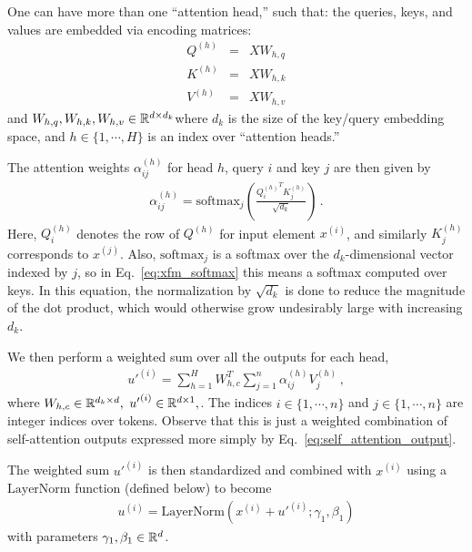 One can have more than one ``attention head,'' such that: the queries, keys, and values are embedded via encoding matrices:
\begin{eqnarray}
  Q^{(h)} &=& X W_{h,q}
  \\
  K^{(h)} &=& X W_{h,k}
  \\
  V^{(h)} &=& X W_{h,v}
\end{eqnarray}
and $W_{h,q}, W_{h,k}, W_{h,v} \in \mathbb{R}^{d\times d_k}$where $d_k$ is the size of the key/query embedding space, and $h \in \{1,\cdots,H\}$ is an index over ``attention heads.'' 

The attention weights $\alpha^{(h)}_{ij}$ for head $h$, query $i$ and key $j$ are then given by
\begin{eqnarray}
  \alpha^{(h)}_{ij} = \text{softmax}_j \left( \frac{{Q^{(h)}_i}^T K^{(h)}_j}{\sqrt{d_k}}  \right)
\,.
\label{eq:xfm_softmax}
\end{eqnarray}
Here, $Q^{(h)}_i$ denotes the row of $Q^{(h)}$ for input element $x^{(i)}$, and similarly $K^{(h)}_j$ corresponds to $x^{(j)}$.  Also, $\text{softmax}_j$ is a softmax over the $d_k$-dimensional vector indexed by $j$, so in Eq.~\ref{eq:xfm_softmax} this means a softmax computed over keys.  In this equation, the normalization by $\sqrt{d_k}$ is done to reduce the magnitude of the dot product, which would otherwise grow undesirably large with increasing $d_k$.

We then perform a weighted sum over all the outputs for each head,
\begin{eqnarray}
  {u'}^{(i)} = \sum_{h=1}^H W^T_{h,c} \sum_{j=1}^{n} \alpha^{(h)}_{ij} V^{(h)}_j
  \,,
\end{eqnarray}
where $W_{h,c} \in \mathbb{R}^{d_k\times d},$ ${u'}^{(i)} \in \mathbb{R}^{d\times 1},$.  The indices $i \in \{1,\cdots,n\}$ and $j \in \{1,\cdots,n\}$ are integer indices over tokens.   Observe that this is just a weighted combination of self-attention outputs expressed more simply by Eq.~\ref{eq:self_attention_output}.

The weighted sum ${u'}^{(i)}$ is then standardized and combined with $x^{(i)}$ using a $\text{LayerNorm}$ function (defined below) to become
\begin{eqnarray}
  {u}^{(i)} = \text{LayerNorm}\left(  x^{(i)} + {u'}^{(i)}; \gamma_1, \beta_1  \right)
\end{eqnarray}
with parameters $\gamma_1, \beta_1 \in \mathbb{R}^{d}$.

